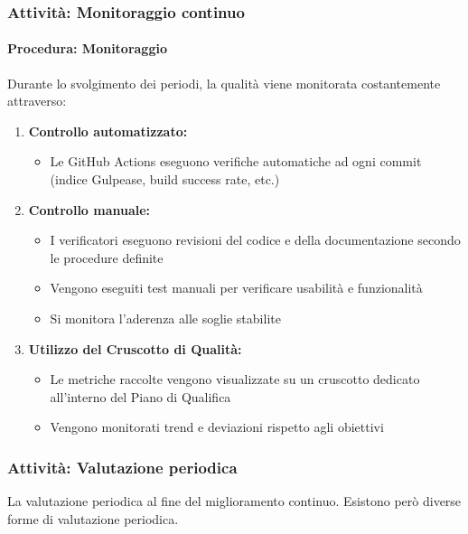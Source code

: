 \documentclass[a4paper,12pt]{article}
\begin{document}
\subsubsection{Attività: Monitoraggio continuo}\label{monitoraggio_continuo}

\paragraph{Procedura: Monitoraggio}
Durante lo svolgimento dei periodi, la qualità viene monitorata costantemente
attraverso:
\begin{enumerate}
    \item \textbf{Controllo automatizzato:}
          \begin{itemize}
              \item Le GitHub Actions eseguono verifiche automatiche ad ogni commit (indice
                    Gulpease, build success rate, etc.)
          \end{itemize}
    \item \textbf{Controllo manuale:}
          \begin{itemize}
              \item I verificatori eseguono revisioni del codice e della documentazione secondo le
                    procedure definite
              \item Vengono eseguiti test manuali per verificare usabilità e funzionalità
              \item Si monitora l'aderenza alle soglie stabilite
          \end{itemize}
    \item \textbf{Utilizzo del Cruscotto di Qualità:}
          \begin{itemize}
              \item Le metriche raccolte vengono visualizzate su un cruscotto dedicato all'interno
                    del Piano di Qualifica
              \item Vengono monitorati trend e deviazioni rispetto agli obiettivi
          \end{itemize}
\end{enumerate}

\subsubsection{Attività: Valutazione periodica}\label{valutazione_periodica}
La valutazione periodica al fine del miglioramento continuo. Esistono però
diverse forme di valutazione periodica.
\end{document}
